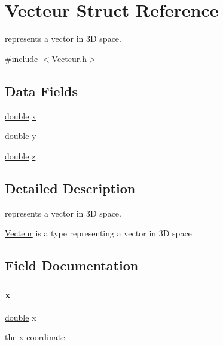 \hypertarget{struct_vecteur}{}\section{Vecteur Struct Reference}
\label{struct_vecteur}


represents a vector in 3D space.  




{\ttfamily \#include $<$Vecteur.\+h$>$}

\subsection*{Data Fields}
\begin{DoxyCompactItemize}
\item 
\hyperlink{g3x__transfo_8h_a89b2b23e407882a535d835574a7912e1}{double} \hyperlink{struct_vecteur_af88b946fb90d5f08b5fb740c70e98c10}{x}
\item 
\hyperlink{g3x__transfo_8h_a89b2b23e407882a535d835574a7912e1}{double} \hyperlink{struct_vecteur_ab927965981178aa1fba979a37168db2a}{y}
\item 
\hyperlink{g3x__transfo_8h_a89b2b23e407882a535d835574a7912e1}{double} \hyperlink{struct_vecteur_ab3e6ed577a7c669c19de1f9c1b46c872}{z}
\end{DoxyCompactItemize}


\subsection{Detailed Description}
represents a vector in 3D space. 

\hyperlink{struct_vecteur}{Vecteur} is a type representing a vector in 3D space 

\subsection{Field Documentation}
\mbox{\label{struct_vecteur_af88b946fb90d5f08b5fb740c70e98c10}} 
\subsubsection{\texorpdfstring{x}{x}}
{\footnotesize\ttfamily \hyperlink{g3x__transfo_8h_a89b2b23e407882a535d835574a7912e1}{double} x}

the x coordinate \mbox{\label{struct_vecteur_ab927965981178aa1fba979a37168db2a}} 
